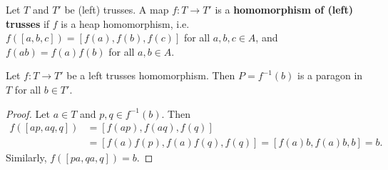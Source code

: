 \documentclass{svmult}
\begin{document}
Let $T$ and $T'$ be (left) trusses. 
A map $f\colon T\to T'$ is a \textbf{homomorphism of (left) trusses} if 
$f$ is a heap homomorphism, i.e. 
$f([a,b,c])=[f(a),f(b),f(c)]$ for all $a,b,c\in A$,
and $f(ab)=f(a)f(b)$ for all $a,b\in A$. 

\begin{proposition}
    Let $f\colon T\to T'$ be a left trusses homomorphism. Then $P=f^{-1}(b)$ 
    is a paragon in $T$ for all $b\in T'$. 
\end{proposition}

\begin{proof}
    Let $a\in T$ and $p,q\in f^{-1}(b)$. Then 
    \begin{align*}
    f([ap,aq,q])&=[f(ap),f(aq),f(q)]\\
    &=[f(a)f(p),f(a)f(q),f(q)]=[f(a)b,f(a)b,b]=b.    
    \end{align*}
    Similarly, $f([pa,qa,q])=b$. 
\end{proof}





\end{document}
